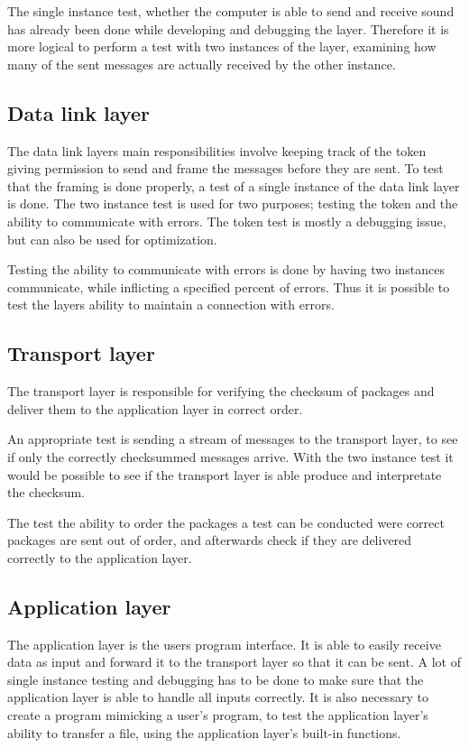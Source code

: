 The single instance test, whether the computer is able to send and receive sound has already been done while developing and debugging the layer. Therefore it is more logical to perform a test with two instances of the layer, examining how many of the sent messages are actually received by the other instance.

\subsection{Data link layer}


The data link layers main responsibilities involve keeping track of the token giving permission to send and frame the messages before they are sent. To test that the framing is done properly, a test of a single instance of the data link layer is done. The two instance test is used for two purposes; testing the token and the ability to communicate with errors. The token test is mostly a debugging issue, but can also be used for optimization.

Testing the ability to communicate with errors is done by having two instances communicate, while inflicting a specified percent of errors. Thus it is possible to test the layers ability to maintain a connection with errors.


\subsection{Transport layer}


The transport layer is responsible for verifying the checksum of packages and deliver them to the application layer in correct order. 

An appropriate test is sending a stream of messages to the transport layer, to see if only the correctly checksummed messages arrive. With the two instance test it would be possible to see if the transport layer is able produce and interpretate the checksum. 

The test the ability to order the packages a test can be conducted were correct packages are sent out of order, and afterwards check if they are delivered correctly to the application layer.

\subsection{Application layer}

The application layer is the users program interface. It is able to easily receive data as input and forward it to the transport layer so that it can be sent. A lot of single instance testing and debugging has to be done to make sure that the application layer is able to handle all inputs correctly. It is also necessary to create a program mimicking a user's program, to test the application layer's ability to transfer a file, using the application layer's built-in functions. 

